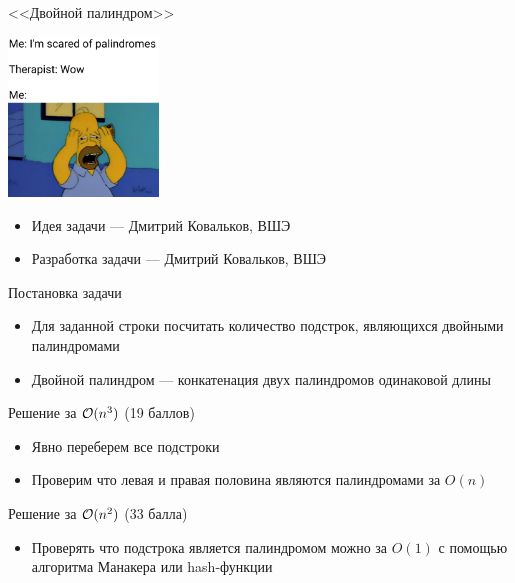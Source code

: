 \begin{frame}
  \begin{center}
    \LARGE <<Двойной палиндром>>
  \end{center}

  \begin{center}
      \includegraphics[width=4cm]{memes/b-meme.jpg}
  \end{center}

  \begin{itemize}
  \item Идея задачи --- Дмитрий Ковальков, ВШЭ
  \item Разработка задачи --- Дмитрий Ковальков, ВШЭ
  \end{itemize}

\end{frame}

\begin{frame}{Постановка задачи}

  \begin{itemize}
  \item Для заданной строки посчитать количество подстрок, являющихся двойными палиндромами
  \item Двойной палиндром --- конкатенация двух палиндромов одинаковой длины
  \end{itemize}
  
\end{frame}

\begin{frame}{Решение за $\mathcal{O}(n^3)$ (19 баллов)}
  \begin{itemize}
  \item Явно переберем все подстроки
  \item Проверим что левая и правая половина являются палиндромами за $O(n)$
  \end{itemize}
\end{frame}

\begin{frame}{Решение за $\mathcal{O}(n^2)$ (33 балла)}
  \begin{itemize}
  \item Проверять что подстрока является палиндромом можно за $O(1)$ с помощью алгоритма Манакера или hash-функции
  \end{itemize}
\end{frame}

